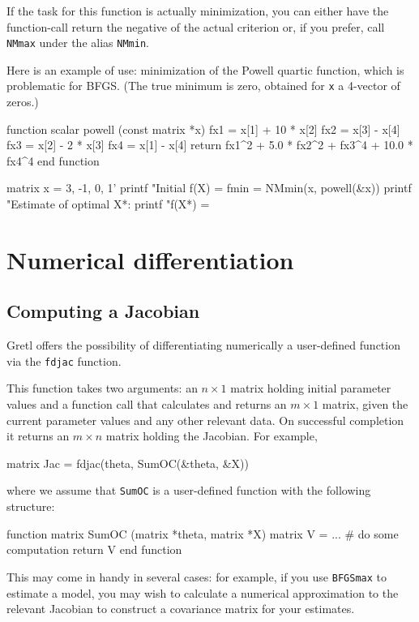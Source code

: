 If the task for this function is actually minimization, you can either
have the function-call return the negative of the actual criterion or,
if you prefer, call \texttt{NMmax} under the alias \texttt{NMmin}.

Here is an example of use: minimization of the Powell quartic
function, which is problematic for BFGS. (The true minimum is zero,
obtained for \texttt{x} a 4-vector of zeros.)
%
\begin{code}
function scalar powell (const matrix *x)
  fx1 = x[1] + 10 * x[2]
  fx2 = x[3] - x[4]
  fx3 = x[2] - 2 * x[3]
  fx4 = x[1] - x[4]
  return fx1^2 + 5.0 * fx2^2 + fx3^4 + 10.0 * fx4^4
end function

matrix x = {3, -1, 0, 1}'
printf "Initial f(X) = %
fmin = NMmin(x, powell(&x))
printf "Estimate of optimal X*:\n%
printf "f(X*) = %
\end{code}

\section{Numerical differentiation}
\label{sec:numdiff}

\subsection{Computing a Jacobian}
\label{sec:fdjac}

Gretl offers the possibility of differentiating numerically a
user-defined function via the \texttt{fdjac} function.

This function takes two arguments: an $n \times 1$ matrix holding
initial parameter values and a function call that calculates and
returns an $m \times 1$ matrix, given the current parameter values and
any other relevant data.  On successful completion it returns an $m
\times n$ matrix holding the Jacobian.  For example,
%
\begin{code}
matrix Jac = fdjac(theta, SumOC(&theta, &X))
\end{code}
where we assume that \texttt{SumOC} is a user-defined function with
the following structure:
%
\begin{code}
function matrix SumOC (matrix *theta, matrix *X)
  matrix V = ...  # do some computation
  return V
end function
\end{code}

This may come in handy in several cases: for example, if you use
\texttt{BFGSmax} to estimate a model, you may wish to calculate a
numerical approximation to the relevant Jacobian to construct a
covariance matrix for your estimates.

